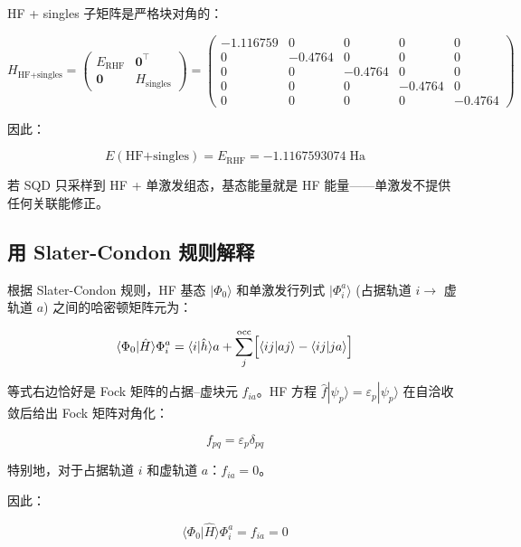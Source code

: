 \documentclass[fontset=mac]{ctexart}
\newcommand{\ket}[1]{|#1\rangle}
\newcommand{\braket}[2]{\langle #1|#2\rangle}
\begin{document}
HF + singles 子矩阵是严格块对角的：

\begin{equation}
H_{\text{HF+singles}} = \begin{pmatrix}
E_{\text{RHF}} & \mathbf{0}^\top \\
\mathbf{0} & H_{\text{singles}}
\end{pmatrix}
= \begin{pmatrix}
-1.116759 & 0 & 0 & 0 & 0 \\
0 & -0.4764 & 0 & 0 & 0 \\
0 & 0 & -0.4764 & 0 & 0 \\
0 & 0 & 0 & -0.4764 & 0 \\
0 & 0 & 0 & 0 & -0.4764
\end{pmatrix}
\end{equation}

因此：

\begin{equation}
    \boxed{E(\text{HF+singles}) = E_{\text{RHF}} = -1.1167593074\;\text{Ha}}
\end{equation}

若 SQD 只采样到 HF + 单激发组态，基态能量就是 HF 能量——单激发不提供任何关联能修正。

\subsection*{用 Slater-Condon 规则解释}

根据 Slater-Condon 规则，HF 基态 $\ket{\Phi_0}$ 和单激发行列式 $\ket{\Phi_i^a}$ (占据轨道 $i\to$ 虚轨道 $a$) 之间的哈密顿矩阵元为：

\begin{equation}
\braket{\Phi_0}{\hat{H}}{\Phi_i^a}
= \braket{i}{\hat{h}}{a} + \sum_{j}^{\text{occ}} \Bigl[\braket{ij}{aj} - \braket{ij}{ja}\Bigr]
\end{equation}

等式右边恰好是 Fock 矩阵的占据--虚块元 $f_{ia}$。HF 方程 $\hat{f}\ket{\psi_p} = \varepsilon_p\ket{\psi_p}$ 在自洽收敛后给出 Fock 矩阵对角化：

\begin{equation}
f_{pq} = \varepsilon_p \delta_{pq}
\end{equation}

特别地，对于占据轨道 $i$ 和虚轨道 $a$：$f_{ia}=0$。

因此：

\begin{equation}
\boxed{\braket{\Phi_0}{\hat{H}}{\Phi_i^a} = f_{ia} = 0}
\end{equation}
\end{document}
